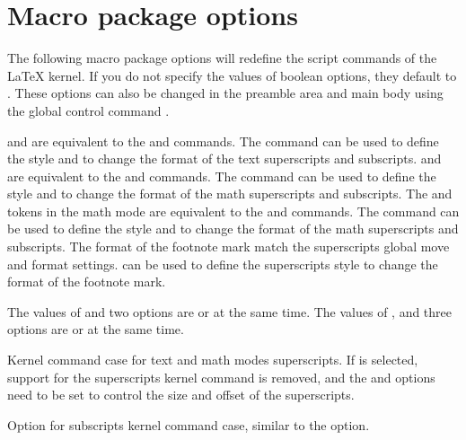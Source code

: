 \documentclass[load-preamble+]{cnltx-doc}
\begin{document}
\section{Macro package options}
The following macro package options will redefine the script commands of the \LaTeX{} kernel. If you do not specify the values of boolean options, they default to . These options can also be changed in the preamble area and main body using the global control command .
\begin{options}
   and  are equivalent to the  and  commands. The command  can be used to define the style  and  to change the format of the text superscripts and subscripts.
   and  are equivalent to the  and  commands. The command  can be used to define the style  and  to change the format of the math superscripts and subscripts.
  The \code{\^{}} and \code{\_{}} tokens in the math mode are equivalent to the  and  commands. The command  can be used to define the style  and  to change the format of the math superscripts and subscripts.
  The format of the footnote mark match the superscripts global move and format settings.  can be used to define the superscripts style  to change the format of the footnote mark.
\begin{codehigh}
\end{codehigh}
  The values of  and  two options are  or  at the same time.
  The values of ,  and  three options are  or  at the same time.
\begin{codehigh}
\usepackage[both]{spbmark}
\usepackage[text,foot=true]{spbmark}
\end{codehigh}
  Kernel command case for text and math modes superscripts. If  is selected, support for the superscripts kernel command is removed, and the  and  options need to be set to control the size and offset of the superscripts.
\begin{codehigh}
\usepackage[spcore=none]{spbmark}
\usepackage{graphicx}
\end{codehigh}
  Option for subscripts kernel command case, similar to the  option.
\end{options}
\end{document}
